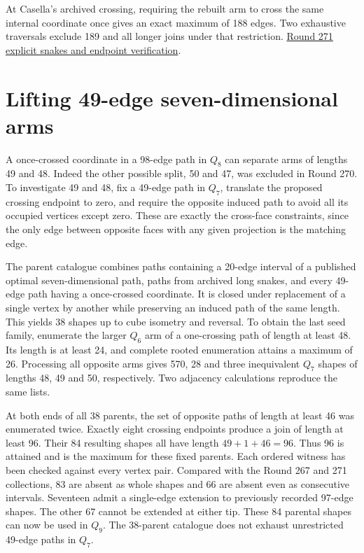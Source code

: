 \documentclass[11pt,a4paper]{article}
\theoremstyle{definition}
\theoremstyle{remark}
\begin{document}
At Casella's archived crossing, requiring the rebuilt arm to cross the same internal coordinate once gives an exact maximum of 188 edges. Two exhaustive traversals exclude 189 and all longer joins under that restriction.
\href{https://github.com/hironaka-iori/Snake-in-the-box-in-9/tree/main/milestones/271-rebuilt-historical-partners}{Round 271 explicit snakes and endpoint verification}.

\section{Lifting 49-edge seven-dimensional arms}
A once-crossed coordinate in a 98-edge path in \(Q_8\) can separate arms of lengths 49 and 48. Indeed the other possible split, 50 and 47, was excluded in Round 270. To investigate 49 and 48, fix a 49-edge path in \(Q_7\), translate the proposed crossing endpoint to zero, and require the opposite induced path to avoid all its occupied vertices except zero. These are exactly the cross-face constraints, since the only edge between opposite faces with any given projection is the matching edge.

The parent catalogue combines paths containing a 20-edge interval of a published optimal seven-dimensional path, paths from archived long snakes, and every 49-edge path having a once-crossed coordinate. It is closed under replacement of a single vertex by another while preserving an induced path of the same length. This yields 38 shapes up to cube isometry and reversal. To obtain the last seed family, enumerate the larger \(Q_6\) arm of a one-crossing path of length at least 48. Its length is at least 24, and complete rooted enumeration attains a maximum of 26. Processing all opposite arms gives 570, 28 and three inequivalent \(Q_7\) shapes of lengths 48, 49 and 50, respectively. Two adjacency calculations reproduce the same lists.

At both ends of all 38 parents, the set of opposite paths of length at least 46 was enumerated twice. Exactly eight crossing endpoints produce a join of length at least 96. Their 84 resulting shapes all have length \(49+1+46=96\). Thus 96 is attained and is the maximum for these fixed parents. Each ordered witness has been checked against every vertex pair. Compared with the Round 267 and 271 collections, 83 are absent as whole shapes and 66 are absent even as consecutive intervals. Seventeen admit a single-edge extension to previously recorded 97-edge shapes. The other 67 cannot be extended at either tip. These 84 parental shapes can now be used in \(Q_9\). The 38-parent catalogue does not exhaust unrestricted 49-edge paths in \(Q_7\).
\end{document}
